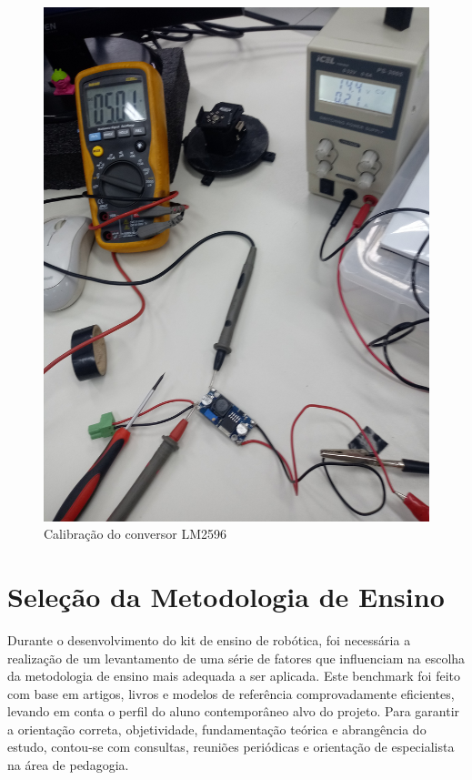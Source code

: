     \begin{figure}[H]
    	\centering
    	\includegraphics[scale=0.4, angle=0]{Figures/conversor2.jpg}
    	\caption{Calibração do conversor LM2596}
    	\label{fig:con2}
    \end{figure}
    
\section{Seleção da Metodologia de Ensino
}

Durante o desenvolvimento do kit de ensino de robótica, foi necessária a realização de um levantamento de uma série de fatores que influenciam na escolha da metodologia de ensino mais adequada a ser aplicada. Este benchmark foi feito com base em artigos, livros  e modelos de referência comprovadamente eficientes, levando em conta o perfil do aluno contemporâneo alvo do projeto. Para garantir a orientação correta, objetividade, fundamentação teórica e abrangência do estudo, contou-se com consultas, reuniões periódicas e orientação de especialista na área de pedagogia. 


